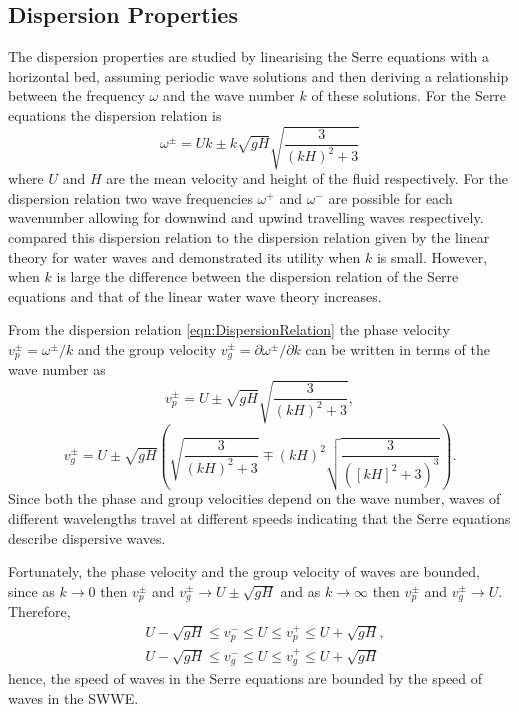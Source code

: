 \subsection{Dispersion Properties}
The dispersion properties are studied by linearising the Serre equations with a horizontal bed, assuming periodic wave solutions and then deriving a relationship between the frequency $\omega$ and the wave number $k$ of these solutions. For the Serre equations the dispersion relation \cite{Li-2014-169} is
\begin{equation}
\label{eqn:DispersionRelation}
\omega^\pm = Uk \pm k \sqrt{gH} \sqrt{\frac{3}{\left(kH\right)^2 + 3}}
\end{equation}
where $U$ and $H$ are the mean velocity and height of the fluid respectively. For the dispersion relation two wave frequencies $\omega^+$ and $\omega^-$ are possible for each wavenumber allowing for downwind and upwind travelling waves respectively. \citet{Barthelemy-2004-315} compared this dispersion relation to the dispersion relation given by the linear theory for water waves and demonstrated its utility when $k$ is small. However, when $k$ is large the difference between the dispersion relation of the Serre equations and that of the linear water wave theory increases. 


From the dispersion relation \eqref{eqn:DispersionRelation} the phase velocity $v_p^\pm = \omega^\pm / k$ and the group velocity $v_g^\pm = \partial \omega^\pm / \partial  k$ can be written in terms of the wave number as
	\begin{equation*}
	\label{eqn:WaveVelocitiesPhase}
	v_p^\pm = U \pm \sqrt{gH}\sqrt{\frac{3}{\left(kH\right)^2 + 3}},
	\end{equation*}
	\begin{equation*}
	\label{eqn:WaveVelocitiesGroup}
	v_g^\pm = U \pm \sqrt{gH} \left(\sqrt{\frac{3}{\left(kH\right)^2 + 3}} \mp \left(kH\right)^2 \sqrt{\frac{3}{\left(\left[kH\right]^2 + 3 \right)^3}}\right).
	\end{equation*}
Since both the phase and group velocities depend on the wave number, waves of different wavelengths travel at different speeds indicating that the Serre equations describe dispersive waves.

Fortunately, the phase velocity and the group velocity of waves are bounded, since as $k \rightarrow 0$ then $v_p^\pm$ and $v_g^\pm \rightarrow U \pm \sqrt{gH}$ and as $k \rightarrow \infty$ then $v_p^\pm$ and $v_g^\pm \rightarrow U$. Therefore,
\begin{subequations}
\begin{align}
&U - \sqrt{gH} \le v_p^- \le U \le v_p^+ \le U + \sqrt{gH}, \\
&U - \sqrt{gH} \le v_g^- \le U \le v_g^+ \le U + \sqrt{gH}
\end{align}
\label{eqn:WaveVelocitiesBound}
\end{subequations}
hence, the speed of waves in the Serre equations are bounded by the speed of waves in the SWWE.

